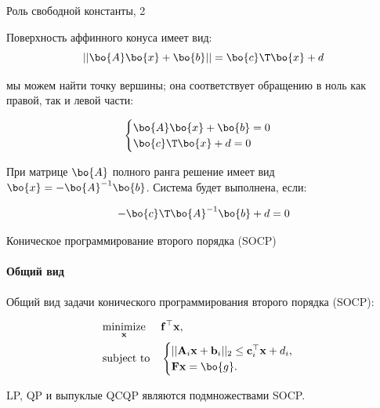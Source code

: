 \documentclass{beamer}
\begin{document}
\begin{frame}{Роль свободной константы, 2}
	\begin{flushleft}
		
		Поверхность аффинного конуса имеет вид:
		\begin{equation}
			||\bo{A}\bo{x}+\bo{b}|| = \bo{c}\T \bo{x} + d
		\end{equation}
		
		мы можем найти точку вершины; она соответствует обращению в ноль как правой, так и левой части:
		
		\begin{equation}
			\begin{cases}
				\bo{A}\bo{x}+\bo{b} = 0 \\
				\bo{c}\T \bo{x} + d = 0
			\end{cases}
		\end{equation}
		
		При матрице $\bo{A}$ полного ранга решение имеет вид $\bo{x} = -\bo{A}^{-1}\bo{b}$. Система будет выполнена, если:
		
		\begin{equation}
			-\bo{c}\T \bo{A}^{-1}\bo{b} + d = 0
		\end{equation}
		
		
	\end{flushleft}
\end{frame}







\begin{frame}{Коническое программирование второго порядка (SOCP)}
	\framesubtitle{Общий вид}
	\begin{flushleft}
		
		
		Общий вид задачи конического программирования второго порядка (SOCP):
		
		\begin{equation}
			\begin{aligned}
				& \underset{\mathbf{x}}{\text{minimize}}
				& & \mathbf{f}^\top\mathbf{x}, \\
				& \text{subject to}
				& & \begin{cases}
					||\mathbf{A}_i\mathbf{x} + \mathbf{b}_i||_2 \leq 
					\mathbf{c}_i^\top \mathbf{x} + d_i, \\
					\mathbf{F}\mathbf{x} = \bo{g}.
				\end{cases}
			\end{aligned}
		\end{equation}
		
		LP, QP и выпуклые QCQP являются подмножествами SOCP.
		
	\end{flushleft}
\end{frame}
\end{document}
